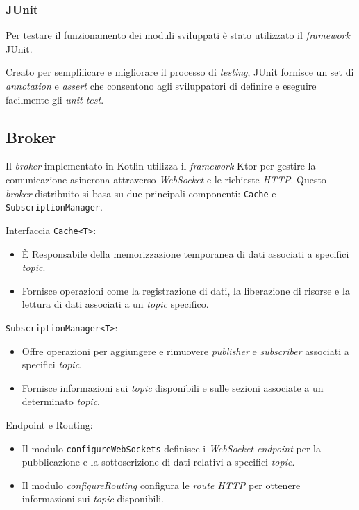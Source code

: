\subsubsection{JUnit}

Per testare il funzionamento dei moduli sviluppati è stato utilizzato il \textit{framework} JUnit\cite{junit}.

Creato per semplificare e migliorare il processo di \textit{testing}, JUnit fornisce un set di \textit{annotation} e \textit{assert} che consentono agli sviluppatori di definire e eseguire facilmente gli \textit{unit test}.

\subsection{Broker}
Il \textit{broker} implementato in Kotlin utilizza il \textit{framework} Ktor per gestire la comunicazione asincrona attraverso \textit{WebSocket} e le richieste \textit{HTTP}. Questo \textit{broker} distribuito si basa su due principali componenti: \texttt{Cache} e \texttt{SubscriptionManager}.

Interfaccia \texttt{Cache<T>}:

\begin{itemize}
    \item È Responsabile della memorizzazione temporanea di dati associati a specifici \textit{topic}.
    \item Fornisce operazioni come la registrazione di dati, la liberazione di risorse e la lettura di dati associati a un \textit{topic} specifico.
\end{itemize}

\texttt{SubscriptionManager<T>}:

\begin{itemize}
    \item Offre operazioni per aggiungere e rimuovere \textit{publisher} e \textit{subscriber} associati a specifici \textit{topic}.
    \item Fornisce informazioni sui \textit{topic} disponibili e sulle sezioni associate a un determinato \textit{topic}.
\end{itemize}

Endpoint e Routing:

\begin{itemize}
    \item Il modulo \texttt{configureWebSockets} definisce i \textit{WebSocket endpoint} per la pubblicazione e la sottoscrizione di dati relativi a specifici \textit{topic}.
    \item Il modulo \textit{configureRouting} configura le \textit{route HTTP} per ottenere informazioni sui \textit{topic} disponibili.
\end{itemize}

